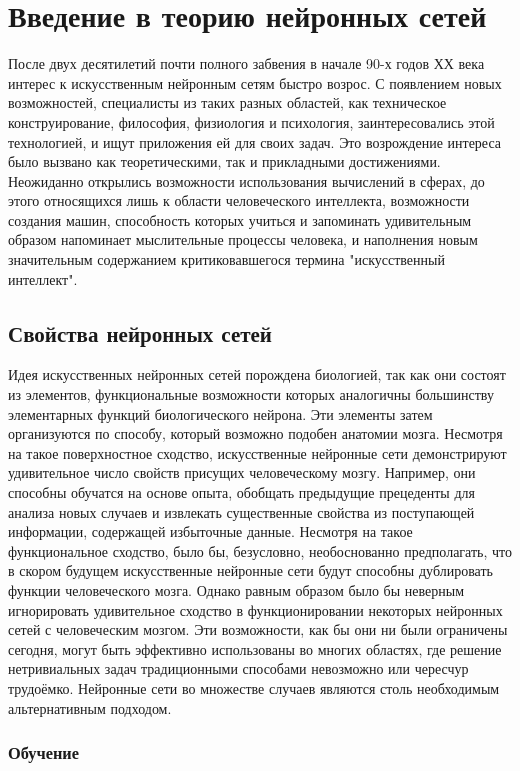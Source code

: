 \documentclass[a4paper,12pt]{report}
\begin{document}
\chapter{Введение в теорию нейронных сетей}
После двух десятилетий почти полного забвения в начале 90-х годов ХХ века интерес к искусственным нейронным сетям быстро возрос. С появлением новых возможностей, специалисты из таких разных областей, как техническое конструирование, философия, физиология и психология, заинтересовались этой технологией, и ищут приложения ей для своих задач. Это возрождение интереса было вызвано как теоретическими, так и прикладными достижениями. Неожиданно открылись возможности использования вычислений в сферах, до этого относящихся лишь к области человеческого интеллекта, возможности создания машин, способность которых учиться и запоминать удивительным образом напоминает мыслительные процессы человека, и наполнения новым значительным содержанием критиковавшегося термина "искусственный интеллект".

\section{Свойства нейронных сетей}
Идея искусственных нейронных сетей порождена биологией, так как они состоят из элементов, функциональные возможности которых аналогичны большинству элементарных функций биологического нейрона. Эти элементы затем организуются по способу, который возможно подобен анатомии мозга. Несмотря на такое поверхностное сходство, искусственные нейронные сети демонстрируют удивительное число свойств присущих человеческому мозгу. Например, они способны обучатся на основе опыта, обобщать предыдущие прецеденты для анализа новых случаев и извлекать существенные свойства из поступающей информации, содержащей избыточные данные. Несмотря на такое функциональное сходство, было бы, безусловно, необоснованно предполагать, что в скором будущем искусственные нейронные сети будут способны дублировать функции человеческого мозга. Однако равным образом было бы неверным игнорировать удивительное сходство в функционировании некоторых нейронных сетей с человеческим мозгом. Эти возможности, как бы они ни были ограничены сегодня, могут быть эффективно использованы во многих областях, где решение нетривиальных задач традиционными способами невозможно или чересчур трудоёмко. Нейронные сети во множестве случаев являются столь необходимым альтернативным подходом.

\subsection{Обучение}
\end{document}
